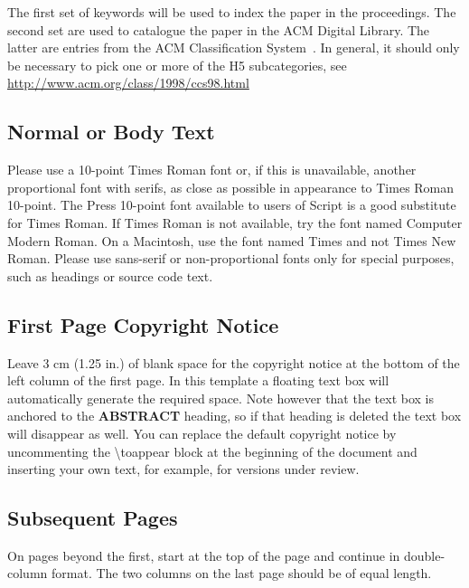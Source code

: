 The first set of keywords will be used to index the paper in the
                                proceedings. The second set are used to catalogue the paper in the ACM
                                Digital Library. The latter are entries from the ACM Classification
                                System~\cite{acm_categories}.  In general, it should only be necessary
                                to pick one or more of the H5 subcategories, see
                                \url{http://www.acm.org/class/1998/ccs98.html}

\subsection{Normal or Body Text}

Please use a 10-point Times Roman font or, if this is unavailable,
                                another proportional font with serifs, as close as possible in
                                appearance to Times Roman 10-point. The Press 10-point font available
                                to users of Script is a good substitute for Times Roman. If Times
                                Roman is not available, try the font named Computer Modern Roman. On a
                                Macintosh, use the font named Times and not Times New Roman. Please
                                use sans-serif or non-proportional fonts only for special purposes,
                                such as headings or source code text.

\subsection{First Page Copyright Notice}

Leave 3 cm (1.25 in.) of blank space for the copyright notice at the
                                bottom of the left column of the first page. In this template a
                                floating text box will automatically generate the required space. Note
                                however that the text box is anchored to the \textbf{ABSTRACT}
                                heading, so if that heading is deleted the text box will disappear as
                                well.  You can replace the default copyright notice by uncommenting
                                the {\textbackslash}toappear block at the beginning of the document
                                and inserting your own text, for example, for versions under review.

\subsection{Subsequent Pages}

On pages beyond the first, start at the top of the page and continue
                                in double-column format.  The two columns on the last page should be
                                of equal length.